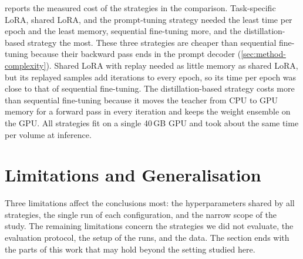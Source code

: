 \begin{table}[tb]
\centering
\caption[Measured cost of the strategies]{Measured cost of the strategies in the comparison (full training split, original task order, one NVIDIA A100 40\,GB). Trainable param.: parameters set as trainable (\cref{sec:method-adaptation}). Epoch: mean time of one training epoch, including validation. Evaluation: median time per test volume, including data loading and text encoding. Peak GPU mem.: maximum over training and evaluation.}
\label{tab:ch6_compute}

\end{table}

 reports the measured cost of the strategies in the comparison.
Task-specific LoRA, shared LoRA, and the prompt-tuning strategy needed the least time per epoch and the least memory, sequential fine-tuning more, and the distillation-based strategy the most.
These three strategies are cheaper than sequential fine-tuning because their backward pass ends in the prompt decoder (\cref{sec:method-complexity}).
Shared LoRA with replay needed as little memory as shared LoRA, but its replayed samples add iterations to every epoch, so its time per epoch was close to that of sequential fine-tuning.
The distillation-based strategy costs more than sequential fine-tuning because it moves the teacher from CPU to GPU memory for a forward pass in every iteration and keeps the weight ensemble on the GPU.
All strategies fit on a single 40\,GB GPU and took about the same time per volume at inference.

\section{Limitations and Generalisation}
\label{sec:exp-limitations}

Three limitations affect the conclusions most: the hyperparameters shared by all strategies, the single run of each configuration, and the narrow scope of the study.
The remaining limitations concern the strategies we did not evaluate, the evaluation protocol, the setup of the runs, and the data.
The section ends with the parts of this work that may hold beyond the setting studied here.

